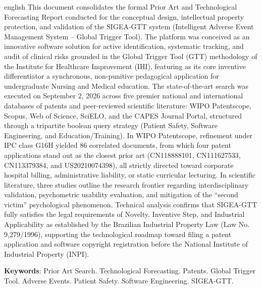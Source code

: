 \begin{resumo}[Abstract]
\begin{otherlanguage*}{english}
This document consolidates the formal Prior Art and Technological Forecasting Report conducted for the conceptual design, intellectual property protection, and validation of the SIGEA-GTT system (Intelligent Adverse Event Management System -- Global Trigger Tool). The platform was conceived as an innovative software solution for active identification, systematic tracking, and audit of clinical risks grounded in the Global Trigger Tool (GTT) methodology of the Institute for Healthcare Improvement (IHI), featuring as its core inventive differentiator a synchronous, non-punitive pedagogical application for undergraduate Nursing and Medical education. The state-of-the-art search was executed on September 2, 2026 across five premier national and international databases of patents and peer-reviewed scientific literature: WIPO Patentscope, Scopus, Web of Science, SciELO, and the CAPES Journal Portal, structured through a tripartite boolean query strategy (Patient Safety, Software Engineering, and Education/Training). In WIPO Patentscope, refinement under IPC class G16H yielded 86 correlated documents, from which four patent applications stand out as the closest prior art (CN118888101, CN111627533, CN113379384, and US20210074398), all strictly directed toward corporate hospital billing, administrative liability, or static curricular lecturing. In scientific literature, three studies outline the research frontier regarding interdisciplinary validation, psychometric usability evaluation, and mitigation of the ``second victim'' psychological phenomenon. Technical analysis confirms that SIGEA-GTT fully satisfies the legal requirements of Novelty, Inventive Step, and Industrial Applicability as established by the Brazilian Industrial Property Law (Law No. 9,279/1996), supporting the technological roadmap toward filing a patent application and software copyright registration before the National Institute of Industrial Property (INPI).

\textbf{Keywords}: Prior Art Search. Technological Forecasting. Patents. Global Trigger Tool. Adverse Events. Patient Safety. Software Engineering. SIGEA-GTT.
\end{otherlanguage*}
\end{resumo}
